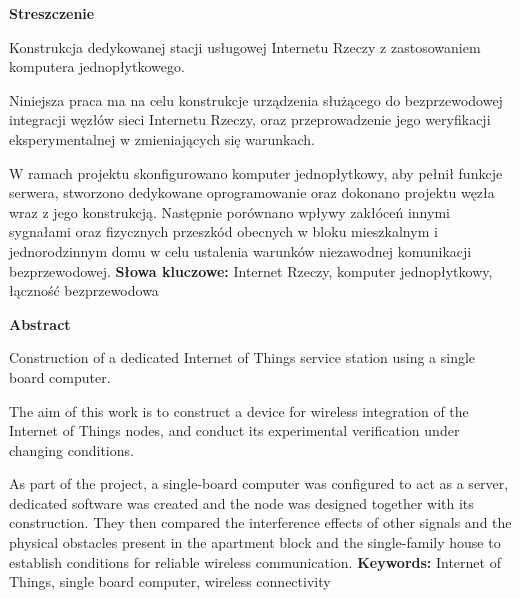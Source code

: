 \documentclass[12pt, twoside, openany]{mwrep}
\begin{document}
\thispagestyle{empty}
\newpage
{}

\newpage
\setcounter{page}{1}

\thispagestyle{empty}
\centerline{\bf Streszczenie}
\centerline\textit{}
Konstrukcja dedykowanej stacji usługowej Internetu Rzeczy z zastosowaniem komputera jednopłytkowego.
   \hfill \break
\par
Niniejsza praca ma na celu konstrukcje urządzenia służącego do bezprzewodowej integracji węzłów sieci Internetu Rzeczy, oraz przeprowadzenie jego weryfikacji eksperymentalnej w zmieniających się warunkach.  
\par
W ramach projektu skonfigurowano komputer jednopłytkowy, aby pełnił funkcje serwera, stworzono dedykowane oprogramowanie oraz dokonano projektu węzła wraz z jego konstrukcją. Następnie porównano wpływy zakłóceń innymi sygnałami oraz fizycznych przeszkód obecnych w bloku mieszkalnym i jednorodzinnym domu w celu ustalenia warunków niezawodnej komunikacji bezprzewodowej.
   \hfill \break
   \hfill \break
\textbf{Słowa kluczowe:} Internet Rzeczy, komputer jednopłytkowy, łączność bezprzewodowa
\clearpage
\thispagestyle{empty}
\centerline{\bf Abstract}
\centerline\textit{}
Construction of a dedicated Internet of Things service station using a single board computer.
   \hfill \break
	\par 
The aim of this work is to construct a device for wireless integration of the Internet of Things nodes, and conduct its experimental verification under changing conditions.
\par
As part of the project, a single-board computer was configured to act as a server, dedicated software was created and the node was designed together with its construction. They then compared the interference effects of other signals and the physical obstacles present in the apartment block and the single-family house to establish conditions for reliable wireless communication.
   \hfill \break
   \hfill \break
\textbf{Keywords:} Internet of Things, single board computer, wireless connectivity
\newpage
\thispagestyle{empty}
\end{document}
